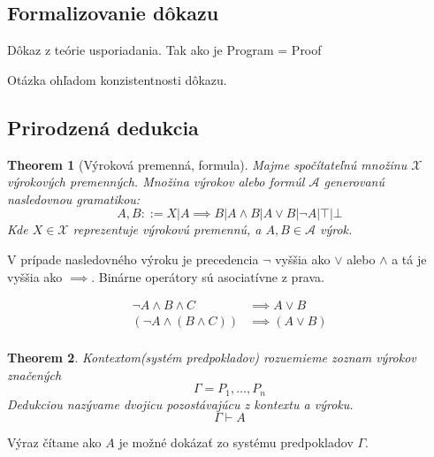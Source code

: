 \documentclass[a4paper,10pt,oneside]{report}%
\newtheorem{theorem}{Theorem}
\begin{document}
\subsection{Formalizovanie dôkazu}

Dôkaz z teórie usporiadania. Tak ako je Program = Proof

Otázka ohľadom konzistentnosti dôkazu.

\subsection{Prirodzená dedukcia}

\begin{theorem}[Výroková premenná, formula]
    Majme spočítateľnú množinu $\mathcal{X}$ výrokových premenných. Množina výrokov
    alebo formúl $\mathcal{A}$ generovanú nasledovnou gramatikou:
    \begin{equation}
        A, B ::= X | A \implies B | A \wedge B | A \vee B | \neg A | \top | \bot
    \end{equation}
    Kde $X \in \mathcal{X}$ reprezentuje výrokovú premennú, a $A, B \in \mathcal{A}$
    výrok.
\end{theorem}

V prípade nasledovného výroku je precedencia $\neg$ vyššia ako $\vee$ alebo $\wedge$
a tá je vyššia ako $\implies$. Binárne operátory sú asociatívne z prava.

\begin{align*}
    \neg A \wedge B \wedge C &\implies A \vee B \\
    (\neg A \wedge (B \wedge C)) &\implies (A \vee B) \\
\end{align*}

\begin{theorem}
    Kontextom(systém predpokladov) rozuemieme zoznam výrokov značených
    \begin{equation}
        \Gamma = P_{1}, \dots , P_{n}
    \end{equation}
    Dedukciou nazývame dvojicu pozostávajúcu z kontextu a výroku.
    \begin{equation}
        \Gamma \vdash A
    \end{equation}
\end{theorem}

Výraz čítame ako $A$ je možné dokázať zo systému predpokladov $\Gamma$.
\end{document}
